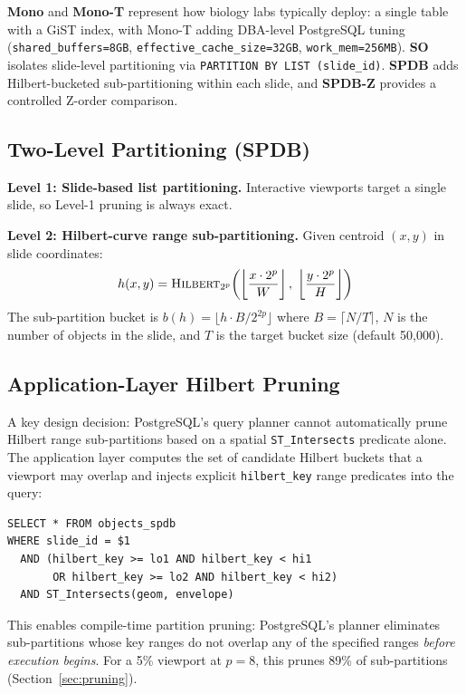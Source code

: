 \documentclass[10pt,twocolumn]{article}
\begin{document}
\textbf{Mono} and \textbf{Mono-T} represent how biology labs typically deploy: a single table with a GiST index, with Mono-T adding DBA-level PostgreSQL tuning (\texttt{shared\_buffers=8GB}, \texttt{effective\_cache\_size=32GB}, \texttt{work\_mem=256MB}).
\textbf{SO} isolates slide-level partitioning via \texttt{PARTITION BY LIST (slide\_id)}.
\textbf{SPDB} adds Hilbert-bucketed sub-partitioning within each slide, and \textbf{SPDB-Z} provides a controlled Z-order comparison.

\subsection{Two-Level Partitioning (SPDB)}

\textbf{Level 1: Slide-based list partitioning.}
Interactive viewports target a single slide, so Level-1 pruning is always exact.

\textbf{Level 2: Hilbert-curve range sub-partitioning.}
Given centroid $(x,y)$ in slide coordinates:
\begin{equation}
h(x, y) = \textsc{Hilbert}_{2^p}\!\left(\left\lfloor \frac{x \cdot 2^p}{W} \right\rfloor,\; \left\lfloor \frac{y \cdot 2^p}{H} \right\rfloor\right)
\end{equation}
The sub-partition bucket is $b(h) = \lfloor h \cdot B / 2^{2p} \rfloor$ where $B = \lceil N/T \rceil$, $N$ is the number of objects in the slide, and $T$ is the target bucket size (default 50{,}000).

\subsection{Application-Layer Hilbert Pruning}

A key design decision: PostgreSQL's query planner cannot automatically prune Hilbert range sub-partitions based on a spatial \texttt{ST\_Intersects} predicate alone.
The application layer computes the set of candidate Hilbert buckets that a viewport may overlap and injects explicit \texttt{hilbert\_key} range predicates into the query:

\begin{lstlisting}
SELECT * FROM objects_spdb
WHERE slide_id = $1
  AND (hilbert_key >= lo1 AND hilbert_key < hi1
       OR hilbert_key >= lo2 AND hilbert_key < hi2)
  AND ST_Intersects(geom, envelope)
\end{lstlisting}

This enables compile-time partition pruning: PostgreSQL's planner eliminates sub-partitions whose key ranges do not overlap any of the specified ranges \emph{before execution begins}.
For a 5\% viewport at $p{=}8$, this prunes 89\% of sub-partitions (Section~\ref{sec:pruning}).
\end{document}
